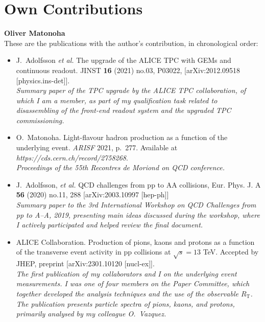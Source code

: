 \documentclass{article}
\begin{document}
\section{Own Contributions}

\textbf{Oliver Matonoha}\\

These are the publications with the author's contribution, in chronological order:

\begin{itemize}
\item J.~Adolfsson \textit{et al.} The upgrade of the ALICE TPC with GEMs and continuous readout.
JINST \textbf{16} (2021) no.03, P03022,
[arXiv:2012.09518 [physics.ins-det]]. \\\textit{Summary paper of the TPC upgrade by the ALICE TPC collaboration, of which I am a member, as part of my qualification task related to disassembling of the front-end readout system and the upgraded TPC commissioning.}

\item O.~Matonoha. Light-flavour hadron production as a function of the underlying event. \textit{ARISF} 2021, p.\ 277. Available at \\\textit{https://cds.cern.ch/record/2758268}. \\\textit{Proceedings of the 55th Recontres de Moriond on QCD conference.}

\item J.~Adolfsson, \textit{et al.}
QCD challenges from pp to A\textendash{}A collisions,
Eur. Phys. J. A \textbf{56} (2020) no.11, 288
[arXiv:2003.10997 [hep-ph]] \\\textit{Summary paper to the 3rd International Workshop on QCD Challenges from pp to A--A, 2019, presenting main ideas discussed during the workshop, where I actively participated and helped review the final document.}

\item ALICE Collaboration. Production of pions, kaons and protons as a function of the transverse event activity in pp collisions at $\sqrt{s}=13$ TeV. Accepted by JHEP, preprint [arXiv:2301.10120 [nucl-ex]]. \\\textit{The first publication of my collaborators and I on the underlying event measurements. I was one of four members on the Paper Committee, which together developed the analysis techniques and the use of the observable $R_\mathrm{T}$. The publication presents particle spectra of pions, kaons, and protons, primarily analysed by my colleague O.\ Vazquez. }


\end{itemize}
\end{document}
